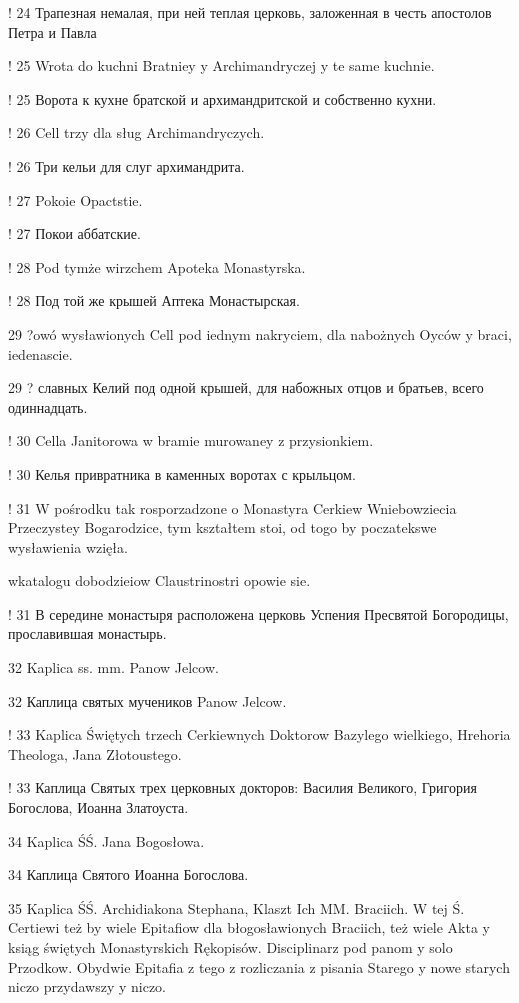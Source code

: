 ! 24 Трапезная немалая, при ней теплая церковь, заложенная в честь апостолов Петра и Павла


! 25 Wrota do kuchni Bratniey y Archimandryczej y te same kuchnie.

! 25 Ворота к кухне братской и архимандритской и собственно кухни.


! 26 Cell trzy dla sług Archimandryczych.

! 26 Три кельи для слуг архимандрита.

! 27 Pokoie Opactstie.

! 27 Покои аббатские.

! 28 Pod tymże wirzchem Apoteka Monastyrska.

! 28 Под той же крышей Аптека Монастырская.

29 ?owó wysławionych Cell pod iednym nakryciem, dla nabożnych Oyców y braci, iedenascie.

29 ? славных Келий под одной крышей, для набожных отцов и братьев, всего одиннадцать.

! 30 Cella Janitorowa w bramie murowaney z przysionkiem.

! 30 Келья привратника в каменных воротах с крыльцом.

! 31 W pośrodku tak rosporzadzone o Monastyra Cerkiew Wniebowziecia Przeczystey Bogarodzice, tym kształtem stoi, od togo by poczatekswe wysławienia wzięła.

wkatalogu dobodzieiow Claustrinostri opowie sie.

! 31 В середине монастыря расположена церковь Успения Пресвятой Богородицы, прославившая монастырь.

32 Kaplica ss. mm. Panow Jelcow.

32 Каплица святых мучеников Panow Jelcow.

! 33 Kaplica Świętych trzech Cerkiewnych Doktorow Bazylego wielkiego, Hrehoria Theologa, Jana Złotoustego.

! 33 Каплица Святых трех церковных докторов: Василия Великого, Григория Богослова, Иоанна Златоуста.

34 Kaplica ŚŚ. Jana Bogosłowa.

34 Каплица Святого Иоанна Богослова.

35 Kaplica ŚŚ. Archidiakona Stephana, Klaszt Ich MM. Braciich. W tej Ś. Certiewi też by wiele Epitafiow dla błogosławionych Braciich, też wiele Akta y ksiąg świętych Monastyrskich Rękopisów. Disciplinarz pod panom y solo Przodkow. Obydwie Epitafia z tego z rozliczania z pisania Starego y nowe starych niczo przydawszy y niczo.

